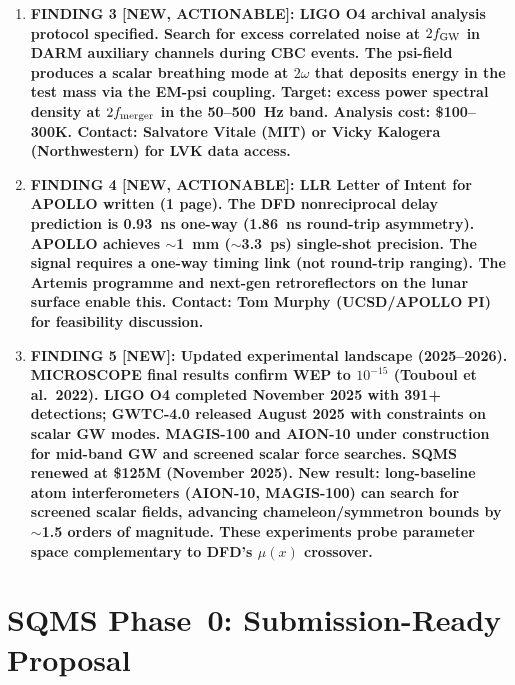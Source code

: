 \documentclass[11pt]{article}
\begin{document}
\begin{tcolorbox}[colback=blue!5!white, colframe=blue!60!black,
  title=\textbf{W4i19 TOP 5 FINDINGS --- Ranked by Programme Impact}]
\begin{enumerate}
\item \textbf{FINDING 3 [NEW, ACTIONABLE]: LIGO O4 archival analysis
protocol specified. Search for excess correlated noise at $2f_{\rm GW}$
in DARM auxiliary channels during CBC events. The psi-field produces a
scalar breathing mode at $2\omega$ that deposits energy in the test mass
via the EM-psi coupling. Target: excess power spectral density at
$2f_{\rm merger}$ in the 50--500~Hz band. Analysis cost: \$100--300K.
Contact: Salvatore Vitale (MIT) or Vicky Kalogera (Northwestern) for
LVK data access.}

\item \textbf{FINDING 4 [NEW, ACTIONABLE]: LLR Letter of Intent for
APOLLO written (1 page). The DFD nonreciprocal delay prediction is
0.93~ns one-way (1.86~ns round-trip asymmetry). APOLLO achieves
$\sim$1~mm ($\sim$3.3~ps) single-shot precision. The signal requires
a one-way timing link (not round-trip ranging). The Artemis programme
and next-gen retroreflectors on the lunar surface enable this.
Contact: Tom Murphy (UCSD/APOLLO PI) for feasibility discussion.}

\item \textbf{FINDING 5 [NEW]: Updated experimental landscape
(2025--2026). MICROSCOPE final results confirm WEP to $10^{-15}$
(Touboul et al.\ 2022). LIGO O4 completed November 2025 with 391+
detections; GWTC-4.0 released August 2025 with constraints on scalar
GW modes. MAGIS-100 and AION-10 under construction for mid-band GW
and screened scalar force searches. SQMS renewed at \$125M (November
2025). New result: long-baseline atom interferometers (AION-10, MAGIS-100)
can search for screened scalar fields, advancing chameleon/symmetron
bounds by $\sim$1.5 orders of magnitude. These experiments probe
parameter space complementary to DFD's $\mu(x)$ crossover.}

\end{enumerate}
\end{tcolorbox}

\tableofcontents
\newpage


\part{SQMS Phase~0: Submission-Ready Proposal}
\label{part:sqms}
\end{document}
